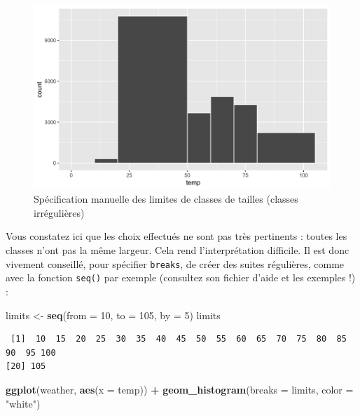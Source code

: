 \documentclass[a4paperpaper,]{article}
\newenvironment{Shaded}{\begin{snugshade}}{\end{snugshade}}
\newcommand{\KeywordTok}[1]{\textcolor[rgb]{0.13,0.29,0.53}{\textbf{#1}}}
\newcommand{\DataTypeTok}[1]{\textcolor[rgb]{0.13,0.29,0.53}{#1}}
\newcommand{\DecValTok}[1]{\textcolor[rgb]{0.00,0.00,0.81}{#1}}
\newcommand{\StringTok}[1]{\textcolor[rgb]{0.31,0.60,0.02}{#1}}
\newcommand{\OperatorTok}[1]{\textcolor[rgb]{0.81,0.36,0.00}{\textbf{#1}}}
\newcommand{\NormalTok}[1]{#1}
\theoremstyle{definition}
\theoremstyle{definition}
\theoremstyle{definition}
\theoremstyle{remark}
\begin{document}
\begin{figure}[htpb]

{\centering \includegraphics[width=0.9\linewidth]{figure/unnamed-chunk-52-1} 

}

\caption{Spécification manuelle des limites de classes de tailles (classes irrégulières)}\label{fig:unnamed-chunk-52}
\end{figure}

Vous constatez ici que les choix effectués ne sont pas très pertinents :
toutes les classes n'ont pas la même largeur. Cela rend l'interprétation
difficile. Il est donc vivement conseillé, pour spécifier
\texttt{breaks}, de créer des suites régulières, comme avec la fonction
\texttt{seq()} par exemple (consultez son fichier d'aide et les exemples
!) :

\begin{Shaded}
\begin{Highlighting}[]
\NormalTok{limits <-}\StringTok{ }\KeywordTok{seq}\NormalTok{(}\DataTypeTok{from =} \DecValTok{10}\NormalTok{, }\DataTypeTok{to =} \DecValTok{105}\NormalTok{, }\DataTypeTok{by =} \DecValTok{5}\NormalTok{)}
\NormalTok{limits}
\end{Highlighting}
\end{Shaded}

\begin{verbatim}
 [1]  10  15  20  25  30  35  40  45  50  55  60  65  70  75  80  85  90  95 100
[20] 105
\end{verbatim}

\begin{Shaded}
\begin{Highlighting}[]
\KeywordTok{ggplot}\NormalTok{(weather, }\KeywordTok{aes}\NormalTok{(}\DataTypeTok{x =}\NormalTok{ temp)) }\OperatorTok{+}
\StringTok{  }\KeywordTok{geom_histogram}\NormalTok{(}\DataTypeTok{breaks =}\NormalTok{ limits, }\DataTypeTok{color =} \StringTok{"white"}\NormalTok{)}
\end{Highlighting}
\end{Shaded}
\end{document}
